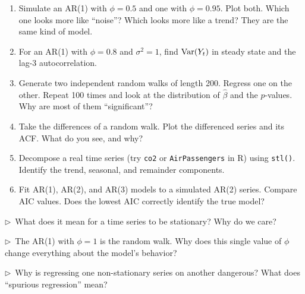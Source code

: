 \begin{enumerate}
  \item Simulate an AR(1) with $\phi = 0.5$ and one with $\phi = 0.95$. Plot both. Which one looks more like ``noise''? Which looks more like a trend? They are the same kind of model.
  \item For an AR(1) with $\phi = 0.8$ and $\sigma^2 = 1$, find $\operatorname{Var}(Y_t)$ in steady state and the lag-3 autocorrelation.
  \item Generate two independent random walks of length 200. Regress one on the other. Repeat 100 times and look at the distribution of $\hat\beta$ and the $p$-values. Why are most of them ``significant''?
  \item Take the differences of a random walk. Plot the differenced series and its ACF. What do you see, and why?
  \item Decompose a real time series (try \texttt{co2} or \texttt{AirPassengers} in R) using \texttt{stl()}. Identify the trend, seasonal, and remainder components.
  \item Fit AR(1), AR(2), and AR(3) models to a simulated AR(2) series. Compare AIC values. Does the lowest AIC correctly identify the true model?
\end{enumerate}

\begin{reflect}
$\triangleright$~What does it mean for a time series to be stationary? Why do we care?

\smallskip
$\triangleright$~The AR(1) with $\phi = 1$ is the random walk. Why does this single value of $\phi$ change everything about the model's behavior?

\smallskip
$\triangleright$~Why is regressing one non-stationary series on another dangerous? What does ``spurious regression'' mean?
\end{reflect}
